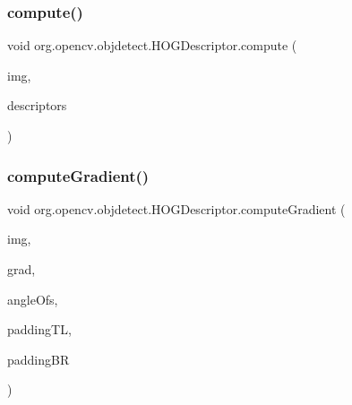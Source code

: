 \mbox{\label{classorg_1_1opencv_1_1objdetect_1_1_h_o_g_descriptor_ae6d657ee7efb071fa3944b64dfa7db18}} 
\subsubsection{\texorpdfstring{compute()}{compute()}\hspace{0.1cm}{\footnotesize\ttfamily [2/2]}}
{\footnotesize\ttfamily void org.\+opencv.\+objdetect.\+H\+O\+G\+Descriptor.\+compute (\begin{DoxyParamCaption}\item[{\mbox{\hyperlink{classorg_1_1opencv_1_1core_1_1_mat}{Mat}}}]{img,  }\item[{\mbox{\hyperlink{classorg_1_1opencv_1_1core_1_1_mat_of_float}{Mat\+Of\+Float}}}]{descriptors }\end{DoxyParamCaption})}

\mbox{\label{classorg_1_1opencv_1_1objdetect_1_1_h_o_g_descriptor_aed983cfea26dfd1de8befbf145b4f5b2}} 
\subsubsection{\texorpdfstring{compute\+Gradient()}{computeGradient()}\hspace{0.1cm}{\footnotesize\ttfamily [1/2]}}
{\footnotesize\ttfamily void org.\+opencv.\+objdetect.\+H\+O\+G\+Descriptor.\+compute\+Gradient (\begin{DoxyParamCaption}\item[{\mbox{\hyperlink{classorg_1_1opencv_1_1core_1_1_mat}{Mat}}}]{img,  }\item[{\mbox{\hyperlink{classorg_1_1opencv_1_1core_1_1_mat}{Mat}}}]{grad,  }\item[{\mbox{\hyperlink{classorg_1_1opencv_1_1core_1_1_mat}{Mat}}}]{angle\+Ofs,  }\item[{\mbox{\hyperlink{classorg_1_1opencv_1_1core_1_1_size}{Size}}}]{padding\+TL,  }\item[{\mbox{\hyperlink{classorg_1_1opencv_1_1core_1_1_size}{Size}}}]{padding\+BR }\end{DoxyParamCaption})}

